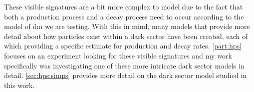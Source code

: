 These visible signatures are a bit more complex to model due to the fact that both a production
process and a decay process need to occur according to the model of \ac{dm} we are testing. With
this in mind, many models that provide more detail about how particles exist within a dark sector
have been created, each of which providing a specific estimate for production and decay rates.
\cref{part:hps} focuses on an experiment looking for these visible signatures and my work
specifically was investigating one of these more intricate dark sector models in detail.
\cref{sec:hps:simps} provides more detail on the dark sector model studied in this work.